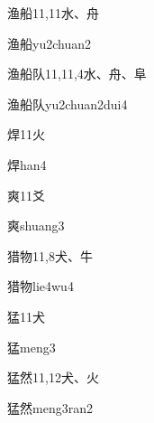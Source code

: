 \begin{entry}{渔船}{11,11}{⽔、⾈}
  \begin{phonetics}{渔船}{yu2chuan2}
  \end{phonetics}
\end{entry}

\begin{entry}{渔船队}{11,11,4}{⽔、⾈、⾩}
  \begin{phonetics}{渔船队}{yu2chuan2dui4}
  \end{phonetics}
\end{entry}

\begin{entry}{焊}{11}{⽕}
  \begin{phonetics}{焊}{han4}
  \end{phonetics}
\end{entry}

\begin{entry}{爽}{11}{⽘}
  \begin{phonetics}{爽}{shuang3}
  \end{phonetics}
\end{entry}

\begin{entry}{猎物}{11,8}{⽝、⽜}
  \begin{phonetics}{猎物}{lie4wu4}
  \end{phonetics}
\end{entry}

\begin{entry}{猛}{11}{⽝}
  \begin{phonetics}{猛}{meng3}
  \end{phonetics}
\end{entry}

\begin{entry}{猛然}{11,12}{⽝、⽕}
  \begin{phonetics}{猛然}{meng3ran2}
  \end{phonetics}
\end{entry}


